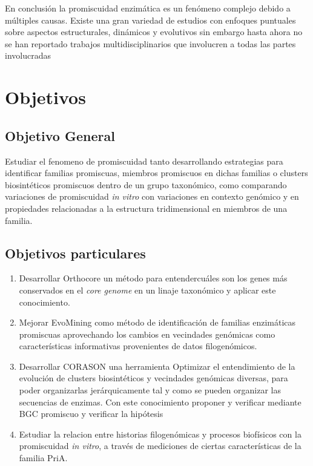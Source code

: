 \documentclass[12pt,twoside]{reedthesis}
\begin{document}
  En conclusión la promiscuidad enzimática es un fenómeno complejo debido
  a múltiples causas. Existe una gran variedad de estudios con enfoques
  puntuales sobre aspectos estructurales, dinámicos y evolutivos sin
  embargo hasta ahora no se han reportado trabajos multidisciplinarios que
  involucren a todas las partes involucradas
  
  \clearpage  
  
  \chapter*{Objetivos}\label{objetivos}
  
  \section{Objetivo General}\label{objetivo-general}
  
  Estudiar el fenomeno de promiscuidad tanto desarrollando estrategias
  para identificar familias promiscuas, miembros promiscuos en dichas
  familias o clusters biosintéticos promiscuos dentro de un grupo
  taxonómico, como comparando variaciones de promiscuidad \emph{in vitro}
  con variaciones en contexto genómico y en propiedades relacionadas a la
  estructura tridimensional en miembros de una familia.
  
  \section{Objetivos particulares}\label{objetivos-particulares}
  
  \begin{enumerate}
  \def\labelenumi{\arabic{enumi}.}
  \item
    Desarrollar Orthocore un método para entendercuáles son los genes más
    conservados en el \emph{core genome} en un linaje taxonómico y aplicar
    este conocimiento.
  \item
    Mejorar EvoMining como método de identificación de familias
    enzimáticas promiscuas aprovechando los cambios en vecindades
    genómicas como características informativas provenientes de datos
    filogenómicos.
  \item
    Desarrollar CORASON una herramienta Optimizar el entendimiento de la
    evolución de clusters biosintéticos y vecindades genómicas diversas,
    para poder organizarlas jerárquicamente tal y como se pueden organizar
    las secuencias de enzimas. Con este conocimiento proponer y verificar
    mediante BGC promiscuo y verificar la hipótesis
  \item
    Estudiar la relacion entre historias filogenómicas y procesos
    biofísicos con la promiscuidad \emph{in vitro}, a través de mediciones
    de ciertas características de la familia PriA.
  \end{enumerate}
  
\end{document}
